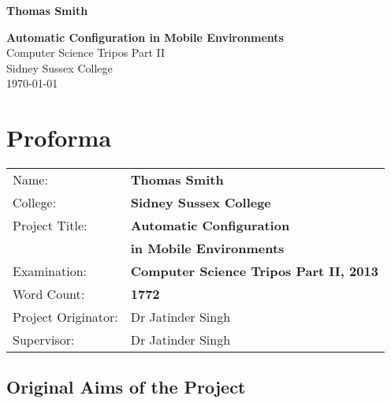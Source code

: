 \documentclass[12pt,twoside,notitlepage]{report}
\begin{document}





\pagestyle{empty}

\hfill{\LARGE \bf Thomas Smith}

\vspace*{60mm}
\begin{center}
\Huge
{\bf Automatic Configuration in Mobile Environments} \\
\vspace*{5mm}
Computer Science Tripos Part II \\
\vspace*{5mm}
Sidney Sussex College \\
\vspace*{5mm}
\today  %
\end{center}

\cleardoublepage


\setcounter{page}{1}
\pagestyle{plain}

\chapter*{Proforma}

{\large
\begin{tabular}{ll}
Name:               & \bf Thomas Smith	\\
College:            & \bf Sidney Sussex College	\\
Project Title:      & \bf Automatic Configuration \\ &\bf in Mobile Environments	\\
Examination:        & \bf Computer Science Tripos Part II, 2013 	\\
Word Count:         & \bf 1772\footnotemark[1] \\
Project Originator: & Dr Jatinder Singh		\\
Supervisor:         & Dr Jatinder Singh		\\ 
\end{tabular}
}



\section*{Original Aims of the Project}
\end{document}
